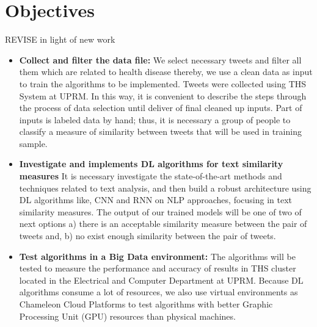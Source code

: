 \documentclass[12pt]{report}
\begin{document}
	
	\section{Objectives}
	REVISE in light of new work
	\begin{itemize}[nolistsep]
		\item \textbf{Collect and filter the data file: } We select necessary tweets and filter all them which are related to health disease thereby, we use a clean data as input to train the algorithms to be implemented. Tweets were collected using \ac{THS} System at \ac{UPRM}. In this way, it is convenient to describe the steps through the process of data selection until deliver of final cleaned up inputs. Part of inputs is labeled data by hand; thus, it is necessary a group of people to classify a measure of similarity between tweets that will be used in training sample.
		\item \textbf{Investigate and implements \ac{DL} algorithms for text similarity measures} It is necessary investigate the state-of-the-art methods and techniques related to text analysis, and then build a robust architecture using \ac{DL} algorithms like, \ac{CNN} and \ac{RNN} on \ac{NLP} approaches,  focusing in text similarity measures. The output of our trained models will be one of two of next options a) there is an acceptable similarity measure between the pair of tweets and, b) no exist enough similarity between the pair of tweets.
		\item \textbf{Test algorithms in a Big Data environment: } The algorithms will be tested to measure the performance and accuracy of results in \ac{THS} cluster located in the Electrical and Computer Department at \ac{UPRM}. Because \ac{DL} algorithms consume a lot of resources, we also use virtual environments as Chameleon Cloud Platforms to test algorithms with better Graphic Processing Unit (GPU) resources than physical machines.
	\end{itemize}
	
\end{document}

